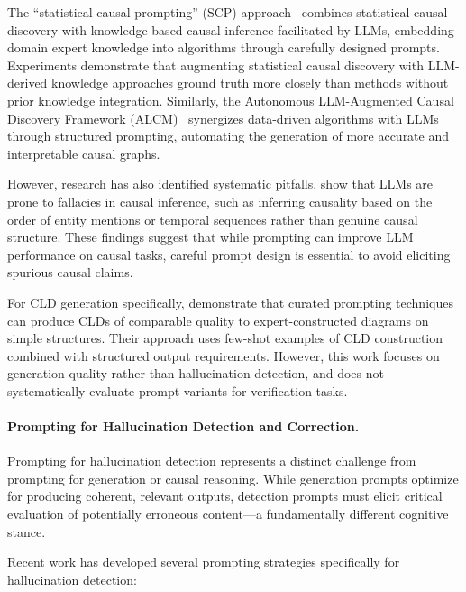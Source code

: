 The ``statistical causal prompting'' (SCP) approach~\citep{takayama2025scp} combines statistical causal discovery with knowledge-based causal inference facilitated by LLMs, embedding domain expert knowledge into algorithms through carefully designed prompts. Experiments demonstrate that augmenting statistical causal discovery with LLM-derived knowledge approaches ground truth more closely than methods without prior knowledge integration. Similarly, the Autonomous LLM-Augmented Causal Discovery Framework (ALCM)~\citep{khatibi2025alcm} synergizes data-driven algorithms with LLMs through structured prompting, automating the generation of more accurate and interpretable causal graphs.

However, research has also identified systematic pitfalls. \citet{joshi2024causalfallacies} show that LLMs are prone to fallacies in causal inference, such as inferring causality based on the order of entity mentions or temporal sequences rather than genuine causal structure. These findings suggest that while prompting can improve LLM performance on causal tasks, careful prompt design is essential to avoid eliciting spurious causal claims.

For CLD generation specifically, \citet{liu2025leveraging} demonstrate that curated prompting techniques can produce CLDs of comparable quality to expert-constructed diagrams on simple structures. Their approach uses few-shot examples of CLD construction combined with structured output requirements. However, this work focuses on generation quality rather than hallucination detection, and does not systematically evaluate prompt variants for verification tasks.

\paragraph{Prompting for Hallucination Detection and Correction.}

Prompting for hallucination detection represents a distinct challenge from prompting for generation or causal reasoning. While generation prompts optimize for producing coherent, relevant outputs, detection prompts must elicit critical evaluation of potentially erroneous content---a fundamentally different cognitive stance.

Recent work has developed several prompting strategies specifically for hallucination detection:

